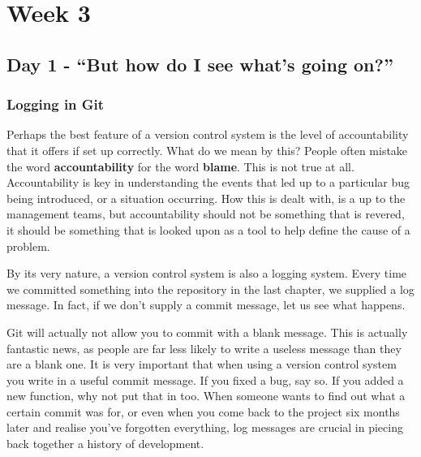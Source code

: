 \cleardoublepage

\chapter{Week 3}
\section{Day 1 - ``But how do I see what's going on?''}
\subsection{Logging in Git}
Perhaps the best feature of a version control system is the level of accountability that it offers if set up correctly.  What do we mean by this?  People often mistake the word \textbf{accountability} for the word \textbf{blame}.  This is not true at all.  Accountability is key in understanding the events that led up to a particular bug being introduced, or a situation occurring.  How this is dealt with, is a up to the management teams, but accountability should not be something that is revered, it should be something that is looked upon as a tool to help define the cause of a problem.

By its very nature, a version control system is also a logging system.  Every time we committed something into the repository in the last chapter, we supplied a log message.  In fact, if we don't supply a commit message, let us see what happens.


Git will actually not allow you to commit with a blank message.  This is actually fantastic news, as people are far less likely to write a useless message than they are a blank one.  It is very important that when using a version control system you write in a useful commit message.  If you fixed a bug, say so.  If you added a new function, why not put that in too.  When someone wants to find out what a certain commit was for, or even when you come back to the project six months later and realise you've forgotten everything, log messages are crucial in piecing back together a history of development.

